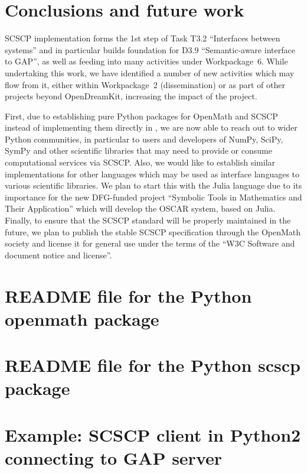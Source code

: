 \documentclass{deliverablereport}
\begin{document}
\section{Conclusions and future work}

SCSCP implementation forms the 1st step of Task T3.2 ``Interfaces
between systems'' and in particular builds foundation for D3.9
``Semantic-aware \Sage interface to GAP'', as well as feeding into
many activities under Workpackage~6. While undertaking this work, we
have identified a number of new activities which may flow from
it, either within Workpackage~2 (dissemination) or as part of other
projects beyond OpenDreamKit, increasing the impact of the project.

First, due to establishing pure Python packages for OpenMath and SCSCP
instead of implementing them directly in \Sage, we are now able to
reach out to wider Python communities, in particular to users and
developers of {\sf NumPy}, {\sf SciPy}, {\sf SymPy} and other
scientific libraries that may need to provide or consume computational
services via SCSCP. Also, we would like to establish similar
implementations for other languages which may be used as interface
languages to various scientific libraries. We plan to start this with the
Julia language due to its importance for the new DFG-funded project
``Symbolic Tools in Mathematics and Their Application'' which will
develop the OSCAR system, based on Julia. Finally, to ensure that the
SCSCP standard will be properly maintained in the future, we plan to
publish the stable SCSCP specification through the OpenMath society
and license it for general use
under the terms of the ``W3C Software and document notice and license''.

\printbibliography

\newpage
\appendix

\section{README file for the Python openmath package}\label{py-openmath_README}


\section{README file for the Python scscp package}\label{py-scscp_README}


\section{Example: SCSCP client in Python2 connecting to GAP server}\label{python2-to-GAP}

\end{document}
